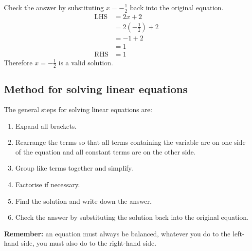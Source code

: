 Check the answer by substituting $x=-\frac{1}{2}$ back into the
original equation.
\begin{align*}
  \mbox{LHS} &= 2x+2 \\
             &= 2(-\frac{1}{2})+2 \\
	     &= -1+2 \\
	     &= 1 \\
  \mbox{RHS} &= 1
\end{align*}
Therefore $x = -\frac{1}{2}$ is a valid solution.
\par
{}


\subsection*{Method for solving linear equations}

The general steps for solving linear equations are:
\begin{enumerate}[noitemsep, label=\textbf{\arabic*}. ] 
    \item Expand all brackets.
    \item Rearrange the terms so that all terms containing the variable are on one side of the equation and all constant terms are on the other side.
    \item Group like terms together and simplify.
    \item Factorise if necessary.
    \item Find the solution and write down the answer.
    \item Check the answer by substituting the solution back into the original equation.
\end{enumerate}

\textbf{Remember:} an equation must always be balanced, whatever you do to the left-hand side, you must also do to the right-hand side.

% 

